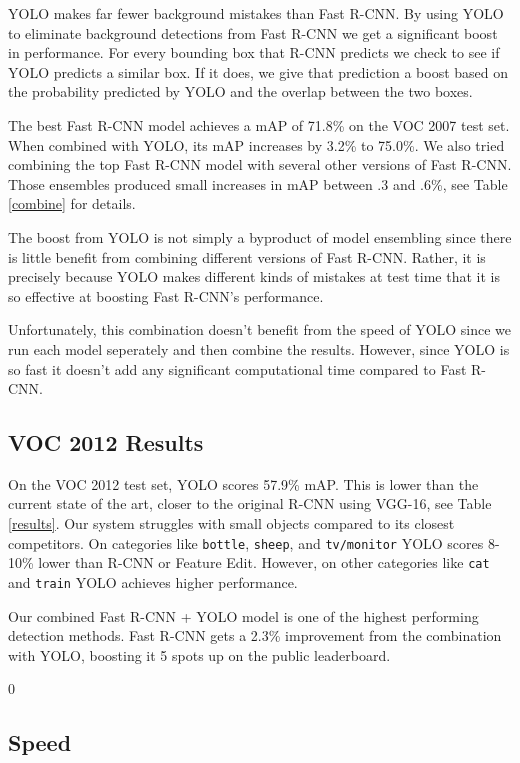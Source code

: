 \documentclass[10pt,twocolumn,letterpaper]{article}
\begin{document}
YOLO makes far fewer background mistakes than Fast R-CNN. By using YOLO to eliminate background detections from Fast R-CNN we get a significant boost in performance. For every bounding box that R-CNN predicts we check to see if YOLO predicts a similar box. If it does, we give that prediction a boost based on the probability predicted by YOLO and the overlap between the two boxes.

The best Fast R-CNN model achieves a mAP of 71.8\% on the VOC 2007 test set. When combined with YOLO, its mAP increases by 3.2\% to 75.0\%. We also tried combining the top Fast R-CNN model with several other versions of Fast R-CNN. Those ensembles produced small increases in mAP between .3 and .6\%, see Table \ref{combine} for details.

The boost from YOLO is not simply a byproduct of model ensembling since there is little benefit from combining different versions of Fast R-CNN. Rather, it is precisely because YOLO makes different kinds of mistakes at test time that it is so effective at boosting Fast R-CNN's performance.

Unfortunately, this combination doesn't benefit from the speed of YOLO since we run each model seperately and then combine the results. However, since YOLO is so fast it doesn't add any significant computational time compared to Fast R-CNN.

\subsection{VOC 2012 Results}

On the VOC 2012 test set, YOLO scores 57.9\% mAP. This is lower than the current state of the art, closer to the original R-CNN using VGG-16, see Table \ref{results}. Our system struggles with small objects compared to its closest competitors. On categories like \texttt{bottle}, \texttt{sheep}, and \texttt{tv/monitor} YOLO scores 8-10\% lower than R-CNN or Feature Edit. However, on other categories like \texttt{cat} and \texttt{train} YOLO achieves higher performance.

Our combined Fast R-CNN + YOLO model is one of the highest performing detection methods. Fast R-CNN gets a 2.3\% improvement from the combination with YOLO, boosting it 5 spots up on the public leaderboard.

 0
\subsection{Speed}
\end{document}
